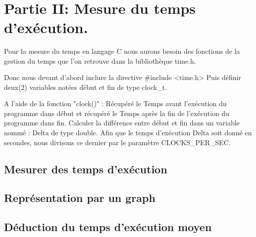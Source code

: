 \documentclass[•]{article}
\begin{document}
\textrm{  }
\\

\section{Partie II: Mesure du temps d'exécution.}
\textrm{
Pour la mesure du temps en langage C nous aurons besoin des fonctions de la gestion du temps que l'on retrouve dans la bibliothèque time.h.}

\textrm{Donc nous devant d'abord inclure la directive \#include <time.h>
Puis définir deux(2) variables notées début et fin de type clock\_t.}

\textrm{A l'aide de la fonction "clock()" :
Récupéré le Temps avant l'exécution du programme dans début et
récupéré le Temps après la fin de l'exécution du programme dans fin.}
\textrm{Calculer la différence entre début et fin dans un variable nommé : Delta de type double.} 
\textrm{Afin que le temps d'exécution Delta soit donné en secondes, nous divisons ce dernier par le paramètre CLOCKS\_PER\_SEC.}

\subsection{Mesurer des temps d'exécution}
\subsection{Représentation par un graph}
\subsection{Déduction du temps d'exécution moyen}
\end{document}
